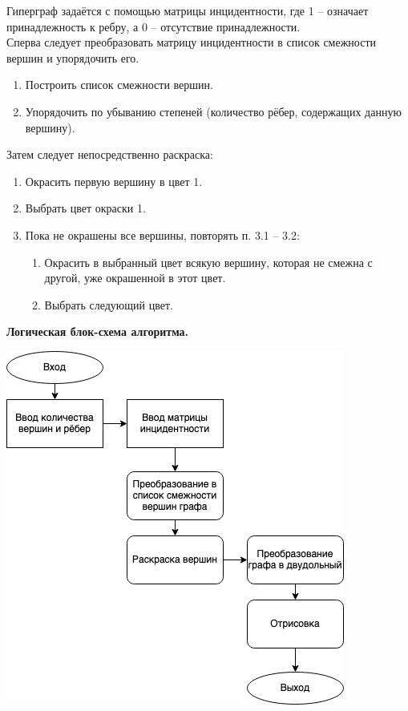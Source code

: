 \documentclass[12pt,a4paper]{article}
\begin{document}
\indent Гиперграф задаётся с помощью матрицы инцидентности, где 1 -- означает принадлежность к ребру, а 0 -- отсутствие принадлежности. \\
\indent Сперва следует преобразовать матрицу инцидентности в список смежности вершин и упорядочить его.
\begin{enumerate}[leftmargin=*]
   \item Построить список смежности вершин.
   \item Упорядочить по убыванию степеней (количество рёбер, содержащих данную вершину).
\end{enumerate}
Затем следует непосредственно раскраска:
\begin{enumerate}[leftmargin=*,label*=\arabic*.]
   \item Окрасить первую вершину в цвет 1.
   \item Выбрать цвет окраски 1.
   \item Пока не окрашены все вершины, повторять п. 3.1 -- 3.2:
   \begin{enumerate}[label*=\arabic*.]
      \item Окрасить в выбранный цвет всякую вершину, которая не смежна с другой, уже окрашенной в этот цвет.
      \item Выбрать следующий цвет.
   \end{enumerate}
\end{enumerate}

\begin{center}
   \textbf{Логическая блок-схема алгоритма.}
\end{center}
\begin{center}
   \includegraphics[scale=0.8]{block-scheme.png}
\end{center}
\setlength\parindent{24pt}
\end{document}

